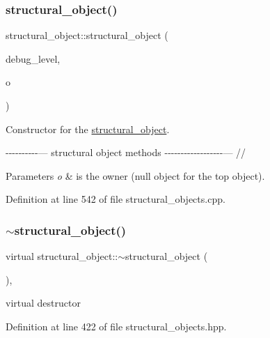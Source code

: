 \subsubsection{\texorpdfstring{structural\+\_\+object()}{structural\_object()}}
{\footnotesize\ttfamily structural\+\_\+object\+::structural\+\_\+object (\begin{DoxyParamCaption}\item[{int}]{debug\+\_\+level,  }\item[{const \hyperlink{structural__objects_8hpp_a8ea5f8cc50ab8f4c31e2751074ff60b2}{structural\+\_\+object\+Ref}}]{o }\end{DoxyParamCaption})}



Constructor for the \hyperlink{classstructural__object}{structural\+\_\+object}. 

-\/-\/-\/-\/-\/-\/-\/-\/-\/-\/--- structural object methods -\/-\/-\/-\/-\/-\/-\/-\/-\/-\/-\/-\/-\/-\/-\/-\/-\/-\/--- //


\begin{DoxyParams}{Parameters}
{\em o} & is the owner (null object for the top object). \\
\hline
\end{DoxyParams}


Definition at line 542 of file structural\+\_\+objects.\+cpp.

\mbox{\label{classstructural__object_ae602f3bc90a576ff01ac7c1811e2c6c0}} 
\subsubsection{\texorpdfstring{$\sim$structural\+\_\+object()}{~structural\_object()}}
{\footnotesize\ttfamily virtual structural\+\_\+object\+::$\sim$structural\+\_\+object (\begin{DoxyParamCaption}{ }\end{DoxyParamCaption})\hspace{0.3cm}{\ttfamily [inline]}, {\ttfamily [virtual]}}



virtual destructor 



Definition at line 422 of file structural\+\_\+objects.\+hpp.




